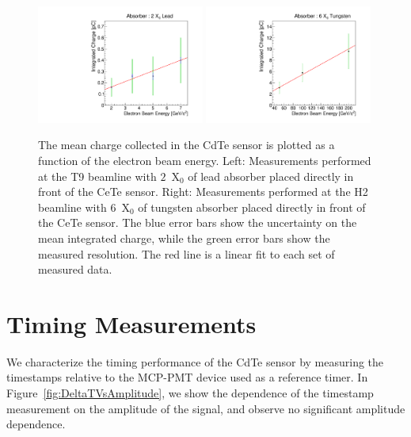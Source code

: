 \documentclass[preprint,1p]{elsarticle}
\begin{document}
\begin{figure}[htbp] 
\centering
\includegraphics[width=0.49\textwidth]{figures/ChargeVsEnergyAt2X0.pdf} 
\includegraphics[width=0.49\textwidth]{figures/ChargeVsEnergyAt6X0.pdf} 
\caption{ The mean charge collected in the CdTe sensor is plotted as a function
of the electron beam energy. Left: Measurements performed at the T9 beamline
with $2$~$\mathrm{X}_{0}$ of lead absorber placed directly in front of the 
CeTe sensor. Right: Measurements performed at the H2 beamline
with $6$~$\mathrm{X}_{0}$ of tungsten absorber placed directly in front of the 
CeTe sensor. The blue error bars show the uncertainty on the mean integrated charge,
while the green error bars show the measured resolution. The red line is a 
linear fit to each set of measured data. } 
\label{fig:ChargeVsEnergy} 
\end{figure} 



\section{Timing Measurements} 
\label{sec:timing} 

We characterize the timing performance of the CdTe sensor by measuring the timestamps
relative to the MCP-PMT device used as a reference timer. In 
Figure~\ref{fig:DeltaTVsAmplitude}, we show the dependence of the timestamp measurement 
on the amplitude of the signal, and observe no significant amplitude dependence.
\end{document}
